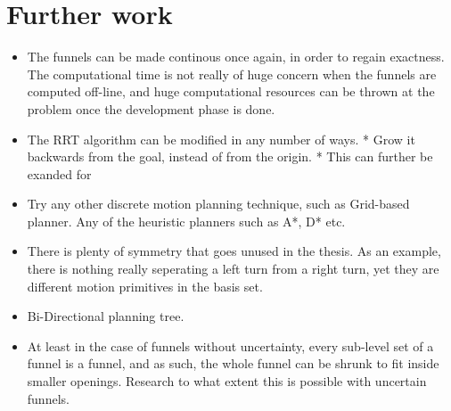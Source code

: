 \chapter{Further work}

\begin{itemize}
  \item The funnels can be made continous once again, in order to regain
    exactness. The computational time is not really of huge concern when the
    funnels are computed off-line, and huge computational resources can be
    thrown at the problem once the development phase is done.
  \item The RRT algorithm can be modified in any number of ways.
    * Grow it backwards from the goal, instead of from the origin.
    * This can further be exanded for 

  \item Try any other discrete motion planning technique, such as Grid-based
    planner. Any of the heuristic planners such as A*, D* etc.

  \item There is plenty of symmetry that goes unused in the thesis. As an
    example, there is nothing really seperating a left turn from a right turn,
    yet they are different motion primitives in the basis set.

  \item Bi-Directional planning tree.

  \item At least in the case of funnels without uncertainty, every sub-level set
    of a funnel is a funnel, and as such, the whole funnel can be shrunk to fit
    inside smaller openings. Research to what extent this is possible with
    uncertain funnels.
\end{itemize}